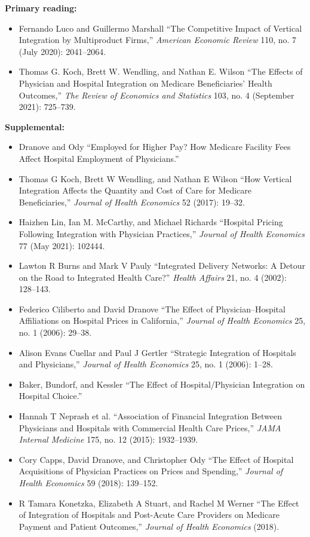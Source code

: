 \documentclass[11pt,]{article}
\providecommand{\tightlist}{%
  \setlength{\itemsep}{0pt}\setlength{\parskip}{0pt}}
\begin{document}
\textbf{Primary reading:}

\begin{itemize}
\tightlist
\item
  Fernando Luco and Guillermo Marshall {``The {Competitive} {Impact} of
  {Vertical} {Integration} by {Multiproduct} {Firms},''} \emph{American
  Economic Review} 110, no. 7 (July 2020): 2041--2064.
\item
  Thomas G. Koch, Brett W. Wendling, and Nathan E. Wilson {``The
  {Effects} of {Physician} and {Hospital} {Integration} on {Medicare}
  {Beneficiaries}' {Health} {Outcomes},''} \emph{The Review of Economics
  and Statistics} 103, no. 4 (September 2021): 725--739.
\end{itemize}

\textbf{Supplemental:}

\begin{itemize}
\tightlist
\item
  Dranove and Ody {``Employed for Higher Pay? {How} {Medicare} Facility
  Fees Affect Hospital Employment of Physicians.''}
\item
  Thomas G Koch, Brett W Wendling, and Nathan E Wilson {``How Vertical
  Integration Affects the Quantity and Cost of Care for {Medicare}
  Beneficiaries,''} \emph{Journal of Health Economics} 52 (2017):
  19--32.
\item
  Haizhen Lin, Ian M. McCarthy, and Michael Richards {``Hospital
  {Pricing} {Following} {Integration} with {Physician} {Practices},''}
  \emph{Journal of Health Economics} 77 (May 2021): 102444.
\item
  Lawton R Burns and Mark V Pauly {``Integrated Delivery Networks: A
  Detour on the Road to Integrated Health Care?''} \emph{Health Affairs}
  21, no. 4 (2002): 128--143.
\item
  Federico Ciliberto and David Dranove {``The Effect of
  Physician--Hospital Affiliations on Hospital Prices in
  {California},''} \emph{Journal of Health Economics} 25, no. 1 (2006):
  29--38.
\item
  Alison Evans Cuellar and Paul J Gertler {``Strategic Integration of
  Hospitals and Physicians,''} \emph{Journal of Health Economics} 25,
  no. 1 (2006): 1--28.
\item
  Baker, Bundorf, and Kessler {``The {Effect} of {Hospital}/{Physician}
  {Integration} on {Hospital} {Choice}.''}
\item
  Hannah T Neprash et al. {``Association of Financial Integration
  Between Physicians and Hospitals with Commercial Health Care
  Prices,''} \emph{JAMA Internal Medicine} 175, no. 12 (2015):
  1932--1939.
\item
  Cory Capps, David Dranove, and Christopher Ody {``The Effect of
  Hospital Acquisitions of Physician Practices on Prices and
  Spending,''} \emph{Journal of Health Economics} 59 (2018): 139--152.
\item
  R Tamara Konetzka, Elizabeth A Stuart, and Rachel M Werner {``The
  Effect of Integration of Hospitals and Post-Acute Care Providers on
  {Medicare} Payment and Patient Outcomes,''} \emph{Journal of Health
  Economics} (2018).
\end{itemize}
\end{document}
